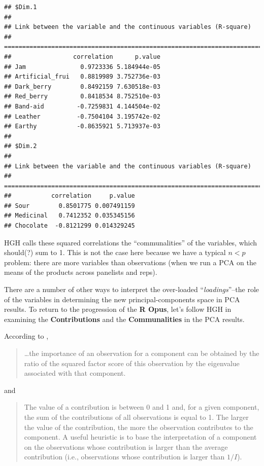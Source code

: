 \documentclass[
]{book}
\begin{document}
\begin{verbatim}
## $Dim.1
## 
## Link between the variable and the continuous variables (R-square)
## =================================================================================
##                 correlation      p.value
## Jam               0.9723336 5.184944e-05
## Artificial_frui   0.8819989 3.752736e-03
## Dark_berry        0.8492159 7.630518e-03
## Red_berry         0.8418534 8.752510e-03
## Band-aid         -0.7259831 4.144504e-02
## Leather          -0.7504104 3.195742e-02
## Earthy           -0.8635921 5.713937e-03
## 
## $Dim.2
## 
## Link between the variable and the continuous variables (R-square)
## =================================================================================
##           correlation     p.value
## Sour        0.8501775 0.007491159
## Medicinal   0.7412352 0.035345156
## Chocolate  -0.8121299 0.014329245
\end{verbatim}

HGH calls these squared correlations the ``communalities'' of the variables, which should(?) sum to 1. This is not the case here because we have a typical \(n<p\) problem: there are more variables than observations (when we run a PCA on the means of the products across panelists and reps).

There are a number of other ways to interpret the over-loaded ``\emph{loadings}''--the role of the variables in determining the new principal-components space in PCA results. To return to the progression of the \textbf{R Opus}, let's follow HGH in examining the \textbf{Contributions} and the \textbf{Communalities} in the PCA results.

According to \citet[8-9]{abdiPrincipal2010},

\begin{quote}
\ldots the importance of an observation for a component can be obtained by the ratio of the squared factor score of this observation by the eigenvalue associated with that component.
\end{quote}

and

\begin{quote}
The value of a contribution is between 0 and 1 and, for a given component, the sum of the contributions of all observations is equal to 1. The larger the value of the contribution, the more the observation contributes to the component. A useful heuristic is to base the interpretation of a component on the observations whose contribution is larger than the average contribution (i.e., observations whose contribution is larger than \(1/I\)).
\end{quote}
\end{document}
